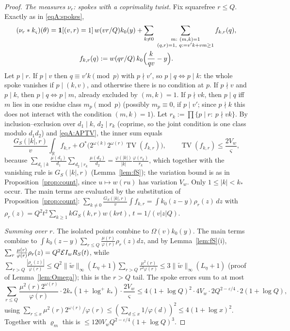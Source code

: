 \begin{proof}
\emph{The measures $\nu_r$: spokes with a coprimality twist.} Fix squarefree $r\le Q$. Exactly as in \eqref{eqA:spokes},
\begin{gather*}
 (\nu_r*\Wkd)(\theta)=\mathbf 1[(v,r)=1]\,w(vr/Q)k_0(y)+\sum_{k\ne0}\ \sum_{\substack{m:\ (m,k)=1\\ (q,r)=1,\ q:=v'k+vm\ge1}}f_{k,r}(q),\\
 f_{k,r}(q):=w(qr/Q)\,k_0\Big(\frac k{qv}-y\Big).
\end{gather*}
Let $p\mid r$. If $p\mid v$ then $q\equiv v'k\pmod p$ with $p\nmid v'$, so $p\mid q\iff p\mid k$: the whole spoke vanishes if $p\mid(k,v)$,
and otherwise there is no condition at $p$. If $p\nmid v$ and $p\mid k$, then $p\mid q\iff p\mid m$, already excluded by $(m,k)=1$.
If $p\nmid vk$, then $p\mid q$ iff $m$ lies in one residue class $m_p\pmod p$ (possibly $m_p\equiv0$, if $p\mid v'$; since $p\nmid k$ this does not interact with the condition $(m,k)=1$). Let $r_k:=\prod\{p\mid r:\ p\nmid vk\}$.
By inclusion--exclusion over $d_1\mid k$, $d_2\mid r_k$ (coprime, so the joint condition is one class modulo $d_1d_2$) and
\eqref{eqA:APTV}, the inner sum equals
\[
 \frac{G_S(|k|,r)}v\int_{\mathbb R}f_{k,r}+O^*\big(2^{\omega(k)}2^{\omega(r)}\operatorname{TV}(f_{k,r})\big),\qquad
 \operatorname{TV}(f_{k,r})\le\frac{2V_w}\varsigma ,
\]
because $\sum_{d_1\mid k}\frac{\mu(d_1)}{d_1}\sum_{d_2\mid r_k}\frac{\mu(d_2)}{d_2}=\frac{\varphi(|k|)}{|k|}\frac{\varphi(r_k)}{r_k}$, which together with the
vanishing rule is $G_S(|k|,r)$ (Lemma~\ref{lem:fS}); the variation bound is as in Proposition~\ref{prop:count}, since
$u\mapsto w(ru)$ has variation $V_w$. Only $1\le|k|<k_*$ occur. The main terms are evaluated by the substitution of
Proposition~\ref{prop:count}: $\sum_{k\ne0}\frac{G_S(|k|,r)}v\int f_{k,r}=\int k_0(z-y)\rho_r(z)\,dz$ with
$\rho_r(z)=Q^2t^2\sum_{k\ge1}kG_S(k,r)w(krt)$, $t=1/(v|z|Q)$.

\emph{Summing over $r$.} The isolated points combine to $\Omega(v)k_0(y)$. The main terms combine to
$\int k_0(z-y)\sum_{r\le Q}\frac{\mu(r)}{\varphi(r)}\rho_r(z)dz$, and by Lemma~\ref{lem:fS}(i),
$\sum_{r}\frac{\mu(r)}{\varphi(r)}\rho_r(z)=Q^2\mathcal{E}I_w R_S(t)$, while $\sum_{r>Q}\frac{|\rho_r(z)|}{\varphi(r)}\le Q^2\|\widetilde w\|_\infty(L_\eta+1)\sum_{r>Q}\frac{\mu^2(r)}{r^2\varphi(r)}
\le3\|\widetilde w\|_\infty(L_\eta+1)$ (proof of Lemma~\ref{lem:Omega}); this is the $r>Q$ tail. The spoke errors sum to at most
\[
 \sum_{r\le Q}\frac{\mu^2(r)2^{\omega(r)}}{\varphi(r)}\cdot2k_*(1+\log^+k_*)\cdot\frac{2V_w}\varsigma\le4(1+\log Q)^2\cdot4V_w\cdot2Q^{2-\varepsilon/4}\cdot2(1+\log Q),
\]
using $\sum_{r\le x}\mu^2(r)2^{\omega(r)}/\varphi(r)\le(\sum_{d\le x}1/\varphi(d))^2\le4(1+\log x)^2$. Together with $\varrho_m$ this is
$\le120V_wQ^{2-\varepsilon/4}(1+\log Q)^3$.


\end{proof}
